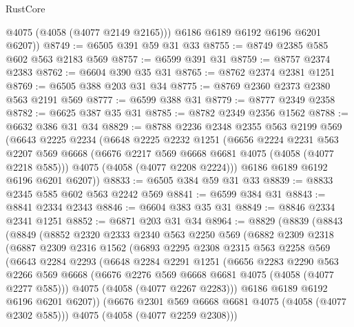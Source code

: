 \begin{lexlean}{RustCore}
\begin{coremodule}
          @4075
          (@4058 (@4077 @2149 @2165)))
        @6186
        @6189
        @6192
        @6196
        @6201
        @6207))
@8749 := @6505 @391 @59 @31 @33
@8755 := @8749 @2385 @585 @602 @563 @2183 @569
@8757 := @6599 @391 @31
@8759 := @8757 @2374 @2383
@8762 := @6604 @390 @35 @31
@8765 := @8762 @2374 @2381 @1251
@8769 := @6505 @388 @203 @31 @34
@8775 := @8769 @2360 @2373 @2380 @563 @2191 @569
@8777 := @6599 @388 @31
@8779 := @8777 @2349 @2358
@8782 := @6625 @387 @35 @31
@8785 := @8782 @2349 @2356 @1562
@8788 := @6632 @386 @31 @34
@8829 := @8788
    @2236
    @2348
    @2355
    @563
    @2199
    @569
    (@6643
      @2225
      @2234
      (@6648
        @2225
        @2232
        @1251
        (@6656
          @2224
          @2231
          @563
          @2207
          @569
          @6668
          (@6676 @2217 @569 @6668 @6681 @4075 (@4058 (@4077 @2218 @585)))
          @4075
          (@4058 (@4077 @2208 @2224)))
        @6186
        @6189
        @6192
        @6196
        @6201
        @6207))
@8833 := @6505 @384 @59 @31 @33
@8839 := @8833 @2345 @585 @602 @563 @2242 @569
@8841 := @6599 @384 @31
@8843 := @8841 @2334 @2343
@8846 := @6604 @383 @35 @31
@8849 := @8846 @2334 @2341 @1251
@8852 := @6871 @203 @31 @34
@8964 := @8829
    (@8839
      (@8843
        (@8849
          (@8852
            @2320
            @2333
            @2340
            @563
            @2250
            @569
            (@6882
              @2309
              @2318
              (@6887
                @2309
                @2316
                @1562
                (@6893
                  @2295
                  @2308
                  @2315
                  @563
                  @2258
                  @569
                  (@6643
                    @2284
                    @2293
                    (@6648
                      @2284
                      @2291
                      @1251
                      (@6656
                        @2283
                        @2290
                        @563
                        @2266
                        @569
                        @6668
                        (@6676 @2276 @569 @6668 @6681 @4075 (@4058 (@4077 @2277 @585)))
                        @4075
                        (@4058 (@4077 @2267 @2283)))
                      @6186
                      @6189
                      @6192
                      @6196
                      @6201
                      @6207))
                  (@6676 @2301 @569 @6668 @6681 @4075 (@4058 (@4077 @2302 @585)))
                  @4075
                  (@4058 (@4077 @2259 @2308)))

\end{coremodule}
\end{lexlean}
